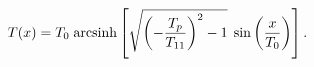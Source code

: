 \begin{equation}\label{tso}
T(x)= T_{0}\;{\rm arcsinh}\left[\sqrt{\left(-\frac{T_{p}}{T_{11}}
\right)^{2}-1}\;\sin\left(\frac{x}{T_{0}}\right)\right].
\end{equation}


